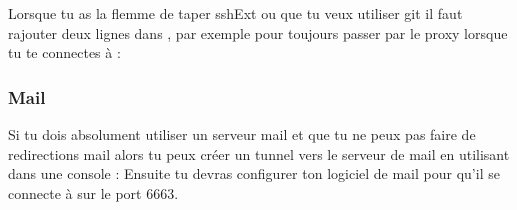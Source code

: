 Lorsque tu as la flemme de taper sshExt ou que tu veux utiliser git il faut rajouter deux lignes dans , par exemple pour toujours passer par le proxy lorsque tu te connectes à  :

\subsubsection{Mail}

Si tu dois absolument utiliser un serveur mail et que tu ne peux pas faire de redirections mail alors tu peux créer un tunnel vers le serveur de mail en utilisant dans une console :
Ensuite tu devras configurer ton logiciel de mail pour qu'il se connecte à  sur le port 6663.
